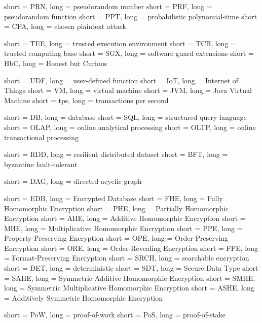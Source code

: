  {
	short = PRN,
	long = pseudorandom number
}
 {
	short = PRF,
	long = pseudorandom function
}
 {
	short = PPT,
	long = probabilistic polynomial-time
}
 {
	short = CPA,
	long = chosen plaintext attack
}

 {
	short = TEE,
	long = trusted execution environment
}
 {
	short = TCB,
	long = trusted computing base
}
 {
	short = SGX,
	long = software guard extensions
}
 {
	short = HbC,
	long = Honest but Curious
}

 {
	short = UDF,
	long = user-defined function
}
 {
	short = IoT,
	long = Internet of Things
}
 {
	short = VM,
	long = virtual machine
}
 {
	short = JVM,
	long = Java Virtual Machine
}
 {
	short = tps,
	long = transactions per second
}

 {
	short = DB,
	long = database
}
 {
	short = SQL,
	long = structured query language
}
 {
	short = OLAP,
	long = online analytical processing
}
 {
	short = OLTP,
	long = online transactional processing
}

 {
	short = RDD,
	long = resilient distributed dataset
}
 {
	short = BFT,
	long = byzantine fault-tolerant
}

 {
	short = DAG,
	long = directed acyclic graph
}

 {
	short = EDB,
	long = Encrypted Database
}
 {
	short = FHE,
	long = Fully Homomorphic Encryption
}
 {
	short = PHE,
	long = Partially Homomorphic Encryption
}
 {
	short = AHE,
	long = Additive Homomorphic Encryption
}
 {
	short = MHE,
	long = Multiplicative Homomorphic Encryption
}
 {
	short = PPE,
	long = Property-Preserving Encryption
}
 {
	short = OPE,
	long = Order-Preserving Encryption
}
 {
	short = ORE,
	long = Order-Revealing Encryption
}
 {
	short = FPE,
	long = Format-Preserving Encryption
}
 {
	short = SRCH,
	long = searchable encryption
}
 {
	short = DET,
	long = deterministic
}
 {
	short = SDT,
	long = Secure Data Type
}
 {
	short = SAHE,
	long = Symmetric Additive Homomorphic Encryption
}
 {
	short = SMHE,
	long = Symmetric Multiplicative Homomorphic Encryption
}
 {
	short = ASHE,
	long = Additively Symmetric Homomorphic Encryption
}

 {
	short = PoW,
	long = proof-of-work
}
 {
	short = PoS,
	long = proof-of-stake
}
